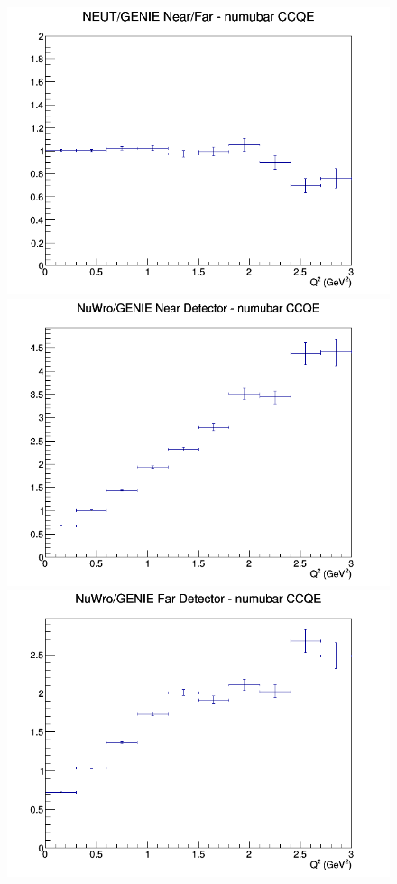 \begin{figure}[h]
\endminipage
{}
\includegraphics[width=\linewidth]{Q2/nominal/ratios/CCQE_NEUT_GENIE_numubar_NF_Q2.png}
\endminipage
\newline
{}
\includegraphics[width=\linewidth]{Q2/nominal/ratios/CCQE_NuWro_GENIE_numubar_near_Q2.png}
\endminipage
{}
\includegraphics[width=\linewidth]{Q2/nominal/ratios/CCQE_NuWro_GENIE_numubar_far_Q2.png}

\end{figure}
